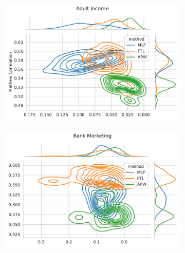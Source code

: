 \begin{figure}
\centering
\caption{Metric distribution optimizing MCC and Equalized Odds in comparison with Fair Transition Loss across multiple resample runs. Corresponding values available at Table~\ref{tab:complete_mcc_odds}.}
\label{tab:complete_mcc_odds}
\begin{subfigure}{.45\linewidth}
    \includegraphics[width=1\linewidth]{images/pareto_mcc_odds_adult.pdf}
\end{subfigure}
\begin{subfigure}{.45\linewidth}
    \includegraphics[width=1\linewidth]{images/pareto_mcc_odds_bank.pdf}
\end{subfigure}


\end{figure}
